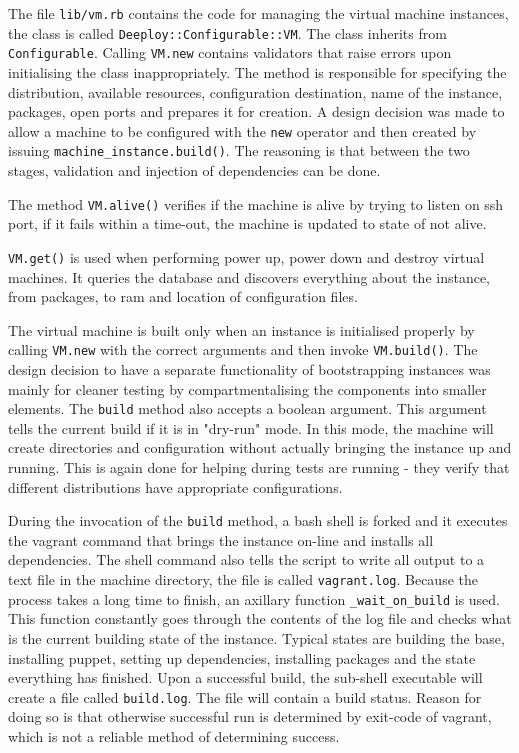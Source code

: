 \documentclass{article}
\begin{document}
The file \texttt{lib/vm.rb} contains the code for managing the virtual machine instances, the class is called \texttt{Deeploy::Configurable::VM}. The class inherits from \texttt{Configurable}. Calling \texttt{VM.new} contains validators that raise errors upon initialising the class inappropriately.
The method is responsible for specifying the distribution, available resources, configuration destination, name of the instance, packages, open ports and prepares it for creation. A design decision was made to allow a machine to be configured with the \texttt{new} operator and then created by issuing \texttt{machine\_instance.build()}. The reasoning is that between the two stages, validation and injection of dependencies can be done. 

The method \texttt{VM.alive()} verifies if the machine is alive by trying to listen on \gls{ssh} port, if it fails within a time-out, the machine is updated to state of not alive.

\texttt{VM.get()} is used when performing power up, power down and destroy virtual machines. It queries the database and discovers everything about the instance, from packages, to \gls{ram} and location of configuration files.

The virtual machine is built only when an instance is initialised properly by calling \texttt{VM.new} with the correct arguments and then invoke \texttt{VM.build()}. The design decision to have a separate functionality of bootstrapping instances was mainly for cleaner testing by compartmentalising the components into smaller elements. The \texttt{build} method also accepts a boolean argument. This argument tells the current build if it is in "dry-run" mode. In this mode, the machine will create directories and configuration without actually bringing the instance up and running. This is again done for helping during tests are running - they verify that different \glspl{distribution} have appropriate configurations.

During the invocation of the \texttt{build} method, a \gls{bash} shell is forked and it executes the \gls{vagrant} command that brings the instance on-line and installs all dependencies. The shell command also tells the script to write all output to a text file in the machine directory, the file is called \texttt{vagrant.log}. Because the process takes a long time to finish, an axillary function \texttt{\_wait\_on\_build} is used. This function constantly goes through the contents of the log file and checks what is the current building state of the instance. Typical states are building the base, installing puppet, setting up dependencies, installing packages and the state everything has finished.
Upon a successful build, the sub-shell executable will create a file called \texttt{build.log}. The file will contain a build status. Reason for doing so is that otherwise successful run is determined by exit-code of vagrant, which is not a reliable method of determining success.
\end{document}
